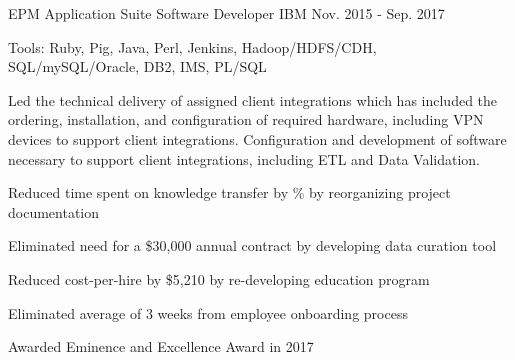 \begin{cventries}
  \cvexpentry
    {EPM Application Suite} %
    {Software Developer} %
    {IBM}
    {Nov. 2015 - Sep. 2017}
    {
      \begin{cvheavyparagraph}
        Tools: Ruby, Pig, Java, Perl, Jenkins, Hadoop/HDFS/CDH, SQL/mySQL/Oracle, DB2, IMS, PL/SQL
      \end{cvheavyparagraph}
    }
    {
      \begin{cvparagraph}
        Led the technical delivery of assigned client integrations which has included the ordering, installation, and configuration of required hardware, including VPN devices to support client integrations.  Configuration and development of software necessary to support client integrations, including ETL and Data Validation.
      \end{cvparagraph}
      \begin{cvitems} %
        \item {Reduced time spent on knowledge transfer by \% by reorganizing project documentation}
        \item {Eliminated need for a \$30,000 annual contract by developing data curation tool}
        \item {Reduced cost-per-hire by \$5,210 by re-developing education program}
        \item {Eliminated average of 3 weeks from employee onboarding process}
        \item {Awarded Eminence and Excellence Award in 2017}
      \end{cvitems}
    }


\end{cventries}
